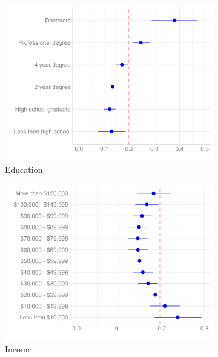 \documentclass[12pt]{article}
\begin{document}
\begin{figure}[ht!]
    \captionsetup[subfigure]{font=footnotesize,labelfont=footnotesize}
    \centering
     \begin{subfigure}[b]{0.49\textwidth}
        \includegraphics[width=1.0\textwidth]{Plots/educ-pred-plot.png}
            \caption{Education}
            \label{fig:grd-int-pol}
    \end{subfigure}
     \begin{subfigure}[b]{0.49\textwidth}
        \includegraphics[width=1.0\textwidth]{Plots/inc-pred-plot.png}
            \caption{Income}
            \label{fig:grd-int-edu}
    \end{subfigure}
    \caption{}
    \label{fig:grd-int}
\end{figure}

\newpage


\end{document}
